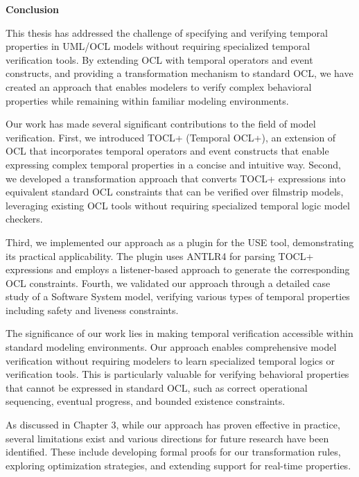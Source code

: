 \begin{center}
  \textbf{\fontsize{20}{24}\selectfont Conclusion}
\end{center}


This thesis has addressed the challenge of specifying and verifying temporal 
properties in UML/OCL models without requiring specialized temporal verification 
tools. By extending OCL with temporal operators and event constructs, and providing 
a transformation mechanism to standard OCL, we have created an approach that enables 
modelers to verify complex behavioral properties while remaining within familiar 
modeling environments.

Our work has made several significant contributions to the field of model verification.
First, we introduced TOCL+ (Temporal OCL+), an extension of OCL that incorporates 
temporal operators and event constructs that enable expressing complex temporal 
properties in a concise and intuitive way. Second, we developed a transformation 
approach that converts TOCL+ expressions into equivalent standard OCL constraints 
that can be verified over filmstrip models, leveraging existing OCL tools without 
requiring specialized temporal logic model checkers.

Third, we implemented our approach as a plugin for the USE tool, demonstrating its 
practical applicability. The plugin uses ANTLR4 for parsing TOCL+ expressions and 
employs a listener-based approach to generate the corresponding OCL constraints.
Fourth, we validated our approach through a detailed case study of a Software System 
model, verifying various types of temporal properties including safety and liveness 
constraints.

The significance of our work lies in making temporal verification accessible within 
standard modeling environments. Our approach enables comprehensive model verification 
without requiring modelers to learn specialized temporal logics or verification tools.
This is particularly valuable for verifying behavioral properties that cannot be 
expressed in standard OCL, such as correct operational sequencing, eventual progress, 
and bounded existence constraints.

As discussed in Chapter 3, while our approach has proven effective in practice, 
several limitations exist and various directions for future research have been 
identified. These include developing formal proofs for our transformation rules, 
exploring optimization strategies, and extending support for real-time properties.

